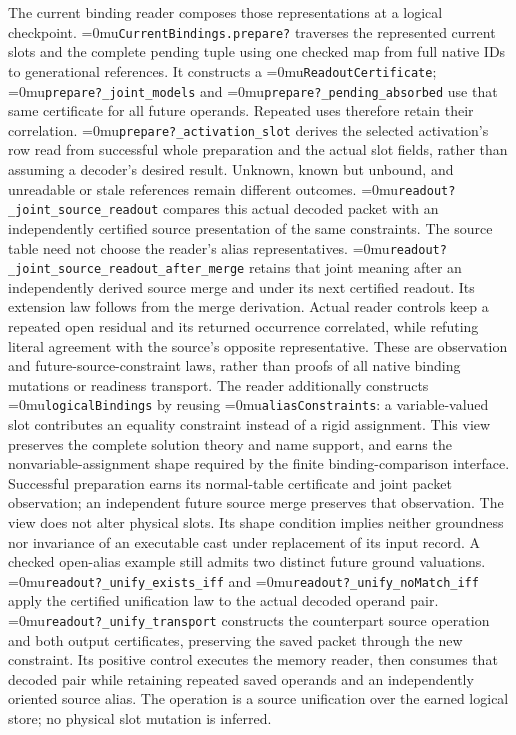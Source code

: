 \documentclass[11pt,a4paper]{article}
\newcommand{\name}[1]{\textup{\Urlmuskip=0mu\relax\nolinkurl{#1}}}
\begin{document}
The current binding reader composes those representations at a logical
checkpoint. \name{CurrentBindings.prepare?} traverses the represented current
slots and the complete pending tuple using one checked map from full native
IDs to generational references. It constructs a \name{ReadoutCertificate};
\name{prepare?_joint_models} and \name{prepare?_pending_absorbed} use that same
certificate for all future operands. Repeated uses therefore retain their
correlation. \name{prepare?_activation_slot} derives the selected activation's
row read from successful whole preparation and the actual slot fields,
rather than assuming a decoder's desired result. Unknown, known but unbound,
and unreadable or stale references remain different outcomes.
\name{readout?_joint_source_readout} compares this actual decoded packet with
an independently certified source presentation of the same constraints.
The source table need not choose the reader's alias representatives.
\name{readout?_joint_source_readout_after_merge} retains that joint meaning
after an independently derived source merge and under its next certified
readout. Its extension law follows from the merge derivation. Actual reader
controls keep a repeated open residual and its returned occurrence correlated,
while refuting literal agreement with the source's opposite representative.
These are observation and future-source-constraint laws, rather than proofs
of all native binding mutations or readiness transport.
The reader additionally constructs \name{logicalBindings} by reusing
\name{aliasConstraints}: a variable-valued slot contributes an equality
constraint instead of a rigid assignment. This view preserves the complete
solution theory and name support, and earns the nonvariable-assignment shape
required by the finite binding-comparison interface. Successful preparation
earns its normal-table certificate and joint packet observation; an independent
future source merge preserves that observation. The view does not alter
physical slots. Its shape condition implies neither groundness nor invariance
of an executable cast under replacement of its input record. A checked
open-alias example still admits two distinct future ground valuations.
\name{readout?_unify_exists_iff} and \name{readout?_unify_noMatch_iff}
apply the certified unification law to the actual decoded operand pair.
\name{readout?_unify_transport} constructs the counterpart source operation
and both output certificates, preserving the saved packet through the new
constraint. Its positive control executes the memory reader, then consumes
that decoded pair while retaining repeated saved operands and an independently
oriented source alias. The operation is a source unification over the earned
logical store; no physical slot mutation is inferred.
\end{document}
